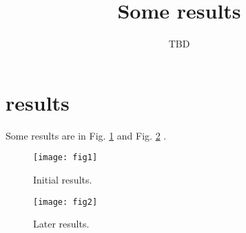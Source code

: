 \documentclass[12pt]{article}
\title{Some results}
\author{TBD}
\begin{document}
\maketitle

\section{results}

Some results are in Fig. \ref{fig1} and Fig. \ref{fig2} \citep{Stei:etal:2004}.


\begin{figure}
 \centering
\texttt{[image: fig1]}
 \caption{
Initial results.\label{fig1}}
\end{figure}


\begin{figure}
 \centering
\texttt{[image: fig2]}
 \caption{
Later results.\label{fig2}}
\end{figure}



\end{document}
